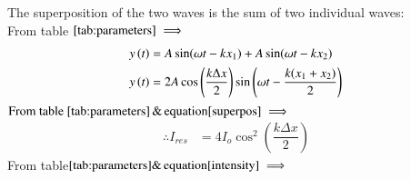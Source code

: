 \documentclass[journal,12pt,twocolumn]{IEEEtran}
\theoremstyle{remark}
\begin{document}
The superposition of the two waves is the sum of two individual waves: \\
From table $\eqref{tab:parameters} \implies$
\begin{align}
y\left(t\right) &= A\sin({\omega t - kx_1})  + A\sin({ \omega t - kx_2}) \\
y\left(t\right) &=  2A\cos\left(\dfrac{k\Delta x}{2}\right)\sin\left(\omega t - \dfrac{k(x_1+x_2)}{2} \right) \label{superpos}
\end{align}
$\text{From table }\eqref{tab:parameters}\, \& \,\text{equation}\eqref{superpos} \implies $ 
\begin{align}
\therefore I_{res} &= 4I_o\cos^2\left(\dfrac{k\Delta x}{2}\right)  \label{intensity}
\end{align}
From table$ \eqref{tab:parameters} \& \,\text{equation}\eqref{intensity} \implies$
\end{document}
